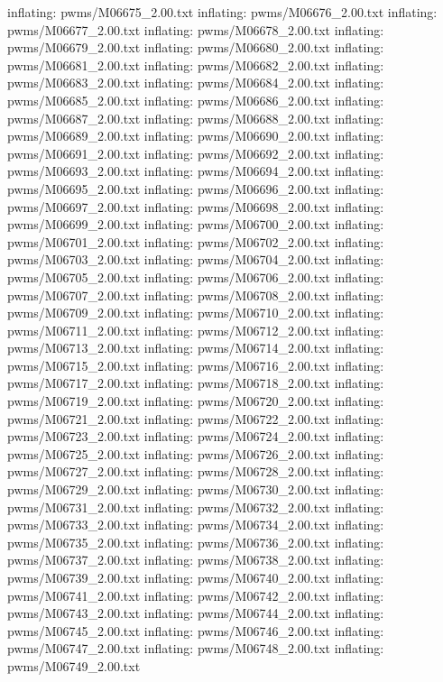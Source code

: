 \documentclass[letterpaper,10pt,english]{sphinxmanual}
\begin{document}
{\begin{sphinxVerbatim}[commandchars=\\\{\}]
  inflating: pwms/M06675\_2.00.txt
  inflating: pwms/M06676\_2.00.txt
  inflating: pwms/M06677\_2.00.txt
  inflating: pwms/M06678\_2.00.txt
  inflating: pwms/M06679\_2.00.txt
  inflating: pwms/M06680\_2.00.txt
  inflating: pwms/M06681\_2.00.txt
  inflating: pwms/M06682\_2.00.txt
  inflating: pwms/M06683\_2.00.txt
  inflating: pwms/M06684\_2.00.txt
  inflating: pwms/M06685\_2.00.txt
  inflating: pwms/M06686\_2.00.txt
  inflating: pwms/M06687\_2.00.txt
  inflating: pwms/M06688\_2.00.txt
  inflating: pwms/M06689\_2.00.txt
  inflating: pwms/M06690\_2.00.txt
  inflating: pwms/M06691\_2.00.txt
  inflating: pwms/M06692\_2.00.txt
  inflating: pwms/M06693\_2.00.txt
  inflating: pwms/M06694\_2.00.txt
  inflating: pwms/M06695\_2.00.txt
  inflating: pwms/M06696\_2.00.txt
  inflating: pwms/M06697\_2.00.txt
  inflating: pwms/M06698\_2.00.txt
  inflating: pwms/M06699\_2.00.txt
  inflating: pwms/M06700\_2.00.txt
  inflating: pwms/M06701\_2.00.txt
  inflating: pwms/M06702\_2.00.txt
  inflating: pwms/M06703\_2.00.txt
  inflating: pwms/M06704\_2.00.txt
  inflating: pwms/M06705\_2.00.txt
  inflating: pwms/M06706\_2.00.txt
  inflating: pwms/M06707\_2.00.txt
  inflating: pwms/M06708\_2.00.txt
  inflating: pwms/M06709\_2.00.txt
  inflating: pwms/M06710\_2.00.txt
  inflating: pwms/M06711\_2.00.txt
  inflating: pwms/M06712\_2.00.txt
  inflating: pwms/M06713\_2.00.txt
  inflating: pwms/M06714\_2.00.txt
  inflating: pwms/M06715\_2.00.txt
  inflating: pwms/M06716\_2.00.txt
  inflating: pwms/M06717\_2.00.txt
  inflating: pwms/M06718\_2.00.txt
  inflating: pwms/M06719\_2.00.txt
  inflating: pwms/M06720\_2.00.txt
  inflating: pwms/M06721\_2.00.txt
  inflating: pwms/M06722\_2.00.txt
  inflating: pwms/M06723\_2.00.txt
  inflating: pwms/M06724\_2.00.txt
  inflating: pwms/M06725\_2.00.txt
  inflating: pwms/M06726\_2.00.txt
  inflating: pwms/M06727\_2.00.txt
  inflating: pwms/M06728\_2.00.txt
  inflating: pwms/M06729\_2.00.txt
  inflating: pwms/M06730\_2.00.txt
  inflating: pwms/M06731\_2.00.txt
  inflating: pwms/M06732\_2.00.txt
  inflating: pwms/M06733\_2.00.txt
  inflating: pwms/M06734\_2.00.txt
  inflating: pwms/M06735\_2.00.txt
  inflating: pwms/M06736\_2.00.txt
  inflating: pwms/M06737\_2.00.txt
  inflating: pwms/M06738\_2.00.txt
  inflating: pwms/M06739\_2.00.txt
  inflating: pwms/M06740\_2.00.txt
  inflating: pwms/M06741\_2.00.txt
  inflating: pwms/M06742\_2.00.txt
  inflating: pwms/M06743\_2.00.txt
  inflating: pwms/M06744\_2.00.txt
  inflating: pwms/M06745\_2.00.txt
  inflating: pwms/M06746\_2.00.txt
  inflating: pwms/M06747\_2.00.txt
  inflating: pwms/M06748\_2.00.txt
  inflating: pwms/M06749\_2.00.txt

\end{sphinxVerbatim}}
\end{document}
